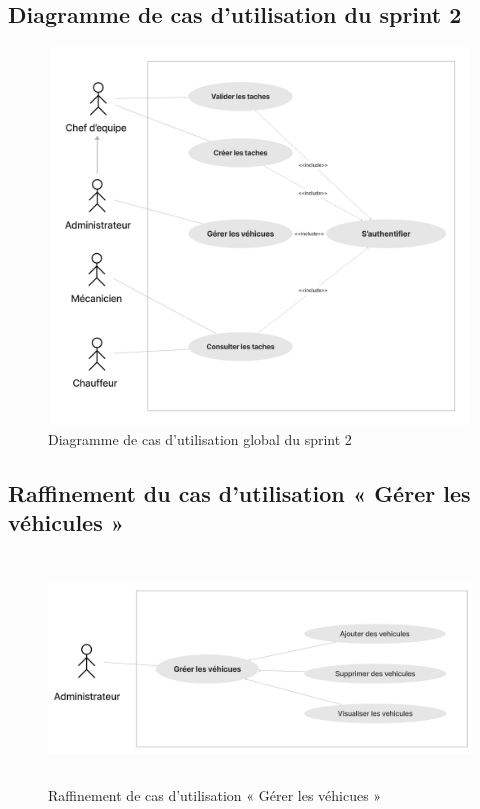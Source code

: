 \subsection{Diagramme de cas d’utilisation du sprint 2 }

\begin{figure}[h!]
  \centering
  \includegraphics[width=1\textwidth,height=10cm]{chap4.images/dcu global sprint 2.png}
  \caption{Diagramme de cas d’utilisation global du sprint 2}

\end{figure}


\subsection{Raffinement du cas d'utilisation « Gérer les véhicules »}

\begin{figure}[h!]
  \centering
  \includegraphics[width=1\textwidth,height=6cm]{chap4.images/raf Gérer les véhicules.png}
  \caption{Raffinement de cas d’utilisation « Gérer les véhicues »}

\end{figure}


